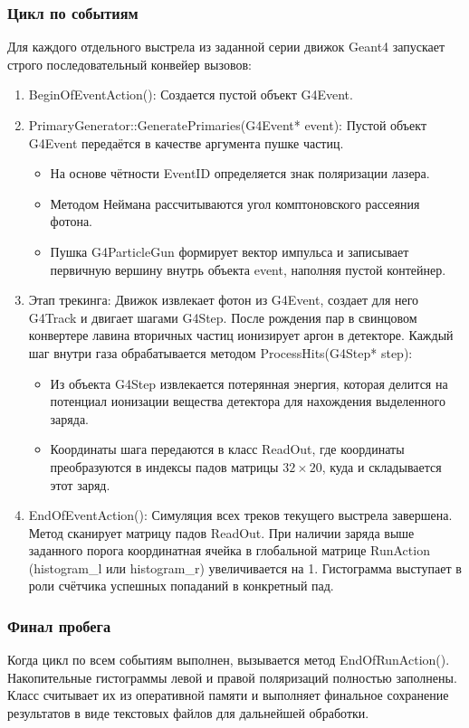 \documentclass[14pt, a4paper]{extreport}
\begin{document}
\subsubsection{Цикл по событиям}
Для каждого отдельного выстрела из заданной серии движок Geant4 запускает строго последовательный конвейер вызовов:
\begin{enumerate}
    \item BeginOfEventAction(): Создается пустой объект G4Event.
    \item PrimaryGenerator::GeneratePrimaries(G4Event* event): Пустой объект G4Event передаётся в качестве аргумента пушке частиц. 
    \begin{itemize}
        \item На основе чётности EventID определяется знак поляризации лазера.
        \item Методом Неймана рассчитываются угол комптоновского рассеяния фотона.
        \item Пушка G4ParticleGun формирует вектор импульса и записывает первичную вершину внутрь объекта event, наполняя пустой контейнер.
    \end{itemize}
    \item Этап трекинга: Движок извлекает фотон из G4Event, создает для него G4Track и двигает шагами G4Step. После рождения пар в свинцовом конвертере лавина вторичных частиц ионизирует аргон в детекторе. Каждый шаг внутри газа обрабатывается методом ProcessHits(G4Step* step):
    \begin{itemize}
        \item Из объекта G4Step извлекается потерянная энергия, которая делится на потенциал ионизации вещества детектора для нахождения выделенного заряда.
        \item Координаты шага передаются в класс ReadOut, где координаты преобразуются в индексы падов матрицы $32 \times 20$, куда и складывается этот заряд.
    \end{itemize}
    \item EndOfEventAction(): Симуляция всех треков текущего выстрела завершена. Метод сканирует матрицу падов ReadOut. При наличии заряда выше заданного порога координатная ячейка в глобальной матрице RunAction (histogram\_l или histogram\_r) увеличивается на 1. Гистограмма выступает в роли счётчика успешных попаданий в конкретный пад.
\end{enumerate}

\subsubsection{Финал пробега}
Когда цикл по всем событиям выполнен, вызывается метод EndOfRunAction(). Накопительные гистограммы левой и правой поляризаций полностью заполнены. Класс считывает их из оперативной памяти и выполняет финальное сохранение результатов в виде текстовых файлов для дальнейшей обработки.
\end{document}
